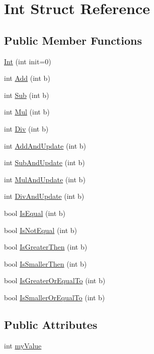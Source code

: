 \hypertarget{struct_int}{\section{Int Struct Reference}
\label{struct_int}
}
\subsection*{Public Member Functions}
\begin{DoxyCompactItemize}
\item 
\hyperlink{struct_int_acf38efbafa6984afdd185c50cc46b9a1}{Int} (int init=0)
\item 
int \hyperlink{struct_int_ae331ebd4ecbc5b541e8ed4367436992f}{Add} (int b)
\item 
int \hyperlink{struct_int_aecdcda2e9a7c7566fa86a02b45b1cfa3}{Sub} (int b)
\item 
int \hyperlink{struct_int_aec6d3adf3ee01748c19ea16645e2d09b}{Mul} (int b)
\item 
int \hyperlink{struct_int_a5bbe35ebeaf5d4dd9b0fe346940655d3}{Div} (int b)
\item 
int \hyperlink{struct_int_ad513d0da6cd23715d3afcba91570cad9}{Add\+And\+Update} (int b)
\item 
int \hyperlink{struct_int_a65bd8e1feab3a6e40f7f294e8fb335f3}{Sub\+And\+Update} (int b)
\item 
int \hyperlink{struct_int_ad2ef7bce7704156b137e10523bd0d850}{Mul\+And\+Update} (int b)
\item 
int \hyperlink{struct_int_a01d3f8f5b739468f98b75ff4882a5ebf}{Div\+And\+Update} (int b)
\item 
bool \hyperlink{struct_int_a0be3fa92ae33169fde228a6c5b368919}{Is\+Equal} (int b)
\item 
bool \hyperlink{struct_int_ad3a289036b77d569944b4bf8daacfa67}{Is\+Not\+Equal} (int b)
\item 
bool \hyperlink{struct_int_a03a5e92fb2ce83f56c5feaf5bae606dc}{Is\+Greater\+Then} (int b)
\item 
bool \hyperlink{struct_int_a83074c7973028ec33e32c641f3048af0}{Is\+Smaller\+Then} (int b)
\item 
bool \hyperlink{struct_int_ade0a495eb80f483473efa54e2cbb7f4a}{Is\+Greater\+Or\+Equal\+To} (int b)
\item 
bool \hyperlink{struct_int_ab563607623b35c98073a45ef68736870}{Is\+Smaller\+Or\+Equal\+To} (int b)
\end{DoxyCompactItemize}
\subsection*{Public Attributes}
\begin{DoxyCompactItemize}
\item 
int \hyperlink{struct_int_af4c6984f25cf742c067f630c9f917b98}{my\+Value}
\end{DoxyCompactItemize}
